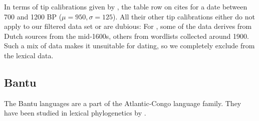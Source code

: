 \documentclass[]{rsos}%
\begin{document}
In terms of tip calibrations given by \textcite{gray2009language}, the table row on  cites \textcite{zoetmulder1982old} for a date between 700 and 1200 BP ($\mu=950, \sigma=125$).
All their other tip calibrations either do not apply to our filtered data set or are dubious:
For , some of the data derives from Dutch sources from the mid-1600s, others from wordlists collected around 1900. Such a mix of data makes it unsuitable for dating, so we completely exclude  from the lexical data.

\subsection{Bantu}\label{s:bantu}
The Bantu languages are a part of the Atlantic-Congo language family. They
have been studied in lexical phylogenetics by
\textcite{grollemund2015bantu,greenhill2018population,currie2013cultural}.
\end{document}
